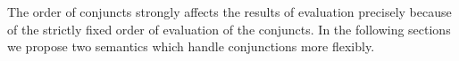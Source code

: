 \begin{comment}
\[
\begin{array}{l}
\inbr{\{\}, 1, \mbox{\lstinline{revers}}^o \, [1] \; \alpha_0 : \epsilon} 
\xrightarrow{\circ} \\
\inbr{\{\alpha_1 = 1; \alpha_2 = []\}, 4, \mbox{\lstinline{revers}}^o \, \alpha_2 \; \alpha_3 : \mbox{\lstinline{append}}^o \, \alpha_3 \; [\alpha_1] \; \alpha_0 : \epsilon}
\xrightarrow{\circ} \\
\inbr{\{\alpha_1 = 1; \alpha_2 = []; \alpha_3 = []\}, 4, \mbox{\lstinline{append}}^o \, \alpha_3 \; [\alpha_1] \; \alpha_0 : \epsilon} 
\xrightarrow{\circ} \\
\inbr{\{\alpha_1 = 1; \alpha_2 = []; \alpha_3 = []\; \alpha_0 = [\alpha_1]\}, \epsilon}
\xrightarrow{\{\alpha_1 = 1; \alpha_2 = []; \alpha_3 = []\; \alpha_0 = [\alpha_1]\}} \emptyset
\end{array}
\]
\end{comment}

The order of conjuncts strongly affects the results of evaluation precisely because of the strictly fixed order of evaluation of the conjuncts. In the following sections
we propose two semantics which handle conjunctions more flexibly.
